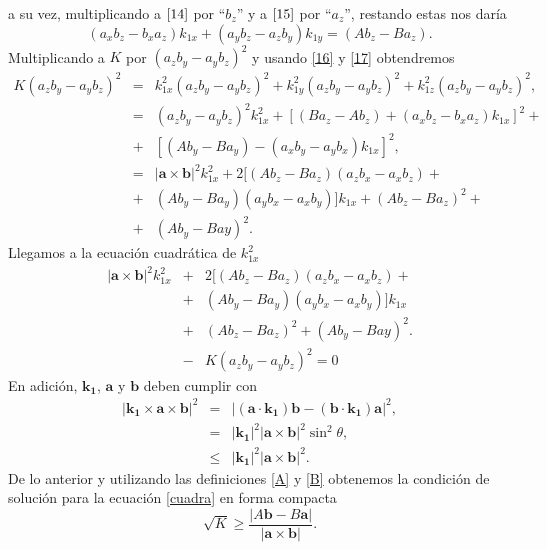 a su vez, multiplicando a \(\ref{14}\) por ``\(b_z\)'' y a \(\ref{15}\) por ``\(a_z\)'', restando estas nos daría
\begin{equation}
    (a_xb_z-b_xa_z)k_{1x} + (a_yb_z - a_zb_y)k_{1y} = (Ab_z-Ba_z).\label{17}
\end{equation}
Multiplicando a \(K\) por \((a_zb_y-a_yb_z)^2\) y usando \ref{16} y \ref{17} obtendremos
\begin{eqnarray}
    K(a_zb_y-a_yb_z)^2 &=& k^2_{1x}(a_zb_y-a_yb_z)^2+k^2_{1y}(a_zb_y-a_yb_z)^2+k^2_{1z}(a_zb_y-a_yb_z)^2,   \\
    &=& (a_zb_y-a_yb_z)^2k^2_{1x} + [(Ba_z-Ab_z)+(a_xb_z-b_xa_z)k_{1x}]^2 + \nonumber \\ 
    &+& [(Ab_y-Ba_y)-(a_xb_y-a_yb_x)k_{1x}]^2,  \\
    &=& |\mathbf{a}\times\mathbf{b}|^2k^2_{1x}+2[(Ab_z-Ba_z)(a_zb_x-a_xb_z)+ \nonumber\\
    &+& (Ab_y-Ba_y)(a_yb_x-a_xb_y)]k_{1x} + (Ab_z-Ba_z)^2 + \nonumber \\
    &+& (Ab_y-Bay)^2.
\end{eqnarray}
Llegamos a la ecuación cuadrática de \(k^2_{1x}\)
\begin{eqnarray}
     |\mathbf{a}\times\mathbf{b}|^2k^2_{1x}&+&2[(Ab_z-Ba_z)(a_zb_x-a_xb_z)+ \nonumber\\
    &+& (Ab_y-Ba_y)(a_yb_x-a_xb_y)]k_{1x} \nonumber \\
    &+&  (Ab_z-Ba_z)^2 + (Ab_y-Bay)^2. \nonumber \\
    &-& K(a_zb_y-a_yb_z)^2 = 0 \label{cuadra}
\end{eqnarray}
En adición, \(\mathbf{k_1}\), \(\mathbf{a}\) y \(\mathbf{b}\) deben cumplir con
\begin{eqnarray}
    |\mathbf{k_1}\times\mathbf{a}\times\mathbf{b}|^2 &=& |(\mathbf{a}\cdot\mathbf{k_1})\mathbf{b}-(\mathbf{b}\cdot\mathbf{k_1})\mathbf{a}|^2, \nonumber \\
    &=& |\mathbf{k_1}|^2|\mathbf{a}\times\mathbf{b}|^2\sin^2{\theta}, \nonumber\\
    &\leq& |\mathbf{k_1}|^2|\mathbf{a}\times\mathbf{b}|^2.
\end{eqnarray}
De lo anterior y utilizando las definiciones \ref{A} y \ref{B} obtenemos la condición de solución para la ecuación \ref{cuadra} en forma compacta
\begin{equation}
    \sqrt{K}\geq\frac{|A\mathbf{b}-B\mathbf{a}|}{|\mathbf{a}\times\mathbf{b}|}.\label{22}
\end{equation}

